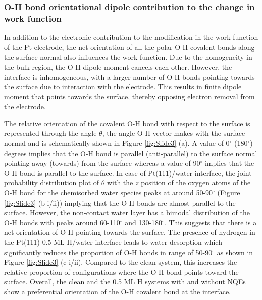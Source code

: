 \subsubsection*{O-H bond orientational dipole contribution to the change in work function}
In addition to the electronic contribution to the modification in the work function of the Pt electrode, the net orientation of all the polar O-H covalent bonds along the surface normal also influences the work function\cite{gross2022ab}. Due to the
homogeneity in the bulk region, the O-H dipole moment cancels each other. However,
the interface is inhomogeneous, with a larger number of O-H bonds pointing
towards the surface due to interaction with the electrode. This results in finite
dipole moment that points towards the surface, thereby opposing electron removal
from the electrode.
  
The relative orientation of the covalent O-H bond with respect to the surface is represented through the angle $\theta$, the angle O-H vector makes with the surface normal and is schematically shown in Figure \ref{fig:Slide3} (a). A value of 0$^{\circ}$ (180$^{\circ}$) degrees implies that the O-H bond is parallel (anti-parallel) to the surface normal pointing away (towards) from the surface whereas a value of 90$^{\circ}$ implies that the O-H bond is parallel to the surface. In case of Pt(111)/water interface, the joint probability distribution plot of $\theta$ with the $z$ position of the oxygen atoms of the O-H bond for the chemisorbed water species peaks at around 50-90$^{\circ}$ (Figure \ref{fig:Slide3} (b-i/ii)) implying that the O-H bonds are almost parallel to the surface. However, the non-contact water layer has a bimodal distribution of the O-H bonds with peaks around 60-110$^{\circ}$ and 130-180$^{\circ}$. This suggests that there is a net orientation of O-H pointing towards the surface. The presence of hydrogen in the Pt(111)-0.5 ML H/water interface leads to water desorption which significantly reduces the proportion of O-H bonds in range of 50-90$^{\circ}$ as shown in Figure \ref{fig:Slide3} (c-i/ii). Compared to the clean system, this increases the relative proportion of configurations where the O-H bond points toward the surface. Overall, the clean and the 0.5 ML H systems with and without NQEs show a preferential orientation of the O-H covalent bond at the interface. 

